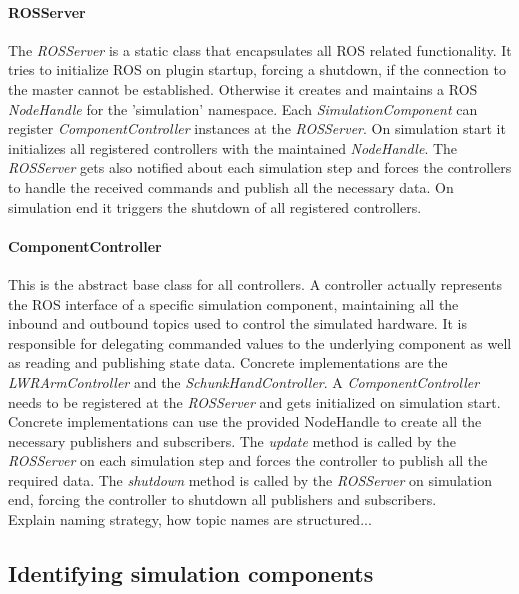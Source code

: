 \paragraph{ROSServer}

The \emph{ROSServer} is a static class that encapsulates all ROS related functionality. It tries to initialize ROS on plugin startup, forcing a shutdown, if the connection to the master cannot be established. Otherwise it creates and maintains a ROS \emph{NodeHandle} for the 'simulation' namespace. Each \emph{SimulationComponent} can register \emph{ComponentController} instances at the \emph{ROSServer}. On simulation start it initializes all registered controllers with the maintained \emph{NodeHandle}. The \emph{ROSServer} gets also notified about each simulation step and forces the controllers to handle the received commands and publish all the necessary data. On simulation end it triggers the shutdown of all registered controllers.
  
\paragraph{ComponentController}

This is the abstract base class for all controllers. A controller actually represents the ROS interface of a specific simulation component, maintaining all the inbound and outbound topics used to control the simulated hardware. It is responsible for delegating commanded values to the underlying component as well as reading and publishing state data. Concrete implementations are the \emph{LWRArmController} and the \emph{SchunkHandController}. A \emph{ComponentController} needs to be registered at the \emph{ROSServer} and gets initialized on simulation start. Concrete implementations can use the provided NodeHandle to create all the necessary publishers and subscribers. The \emph{update} method is called by the \emph{ROSServer} on each simulation step and forces the controller to publish all the required data. The \emph{shutdown} method is called by the \emph{ROSServer} on simulation end, forcing the controller to shutdown all publishers and subscribers. \\

Explain naming strategy, how topic names are structured...

\subsection{Identifying simulation components}
\label{sec:comp_id}

